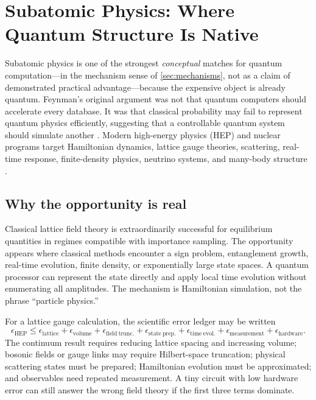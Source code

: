 \section{Subatomic Physics: Where Quantum Structure Is Native}\label{sec:hep}

Subatomic physics is one of the strongest \emph{conceptual} matches for quantum computation---in the mechanism sense of \cref{sec:mechanisms}, not as a claim of demonstrated practical advantage---because the expensive object is already quantum. Feynman's original argument was not that quantum computers should accelerate every database. It was that classical probability may fail to represent quantum physics efficiently, suggesting that a controllable quantum system should simulate another \citep{feynman1982}. Modern high-energy physics (HEP) and nuclear programs target Hamiltonian dynamics, lattice gauge theories, scattering, real-time response, finite-density physics, neutrino systems, and many-body structure \citep{bauer2023prx,bauer2023nrp,dimeglio2024}.

\subsection{Why the opportunity is real}

Classical lattice field theory is extraordinarily successful for equilibrium quantities in regimes compatible with importance sampling. The opportunity appears where classical methods encounter a sign problem, entanglement growth, real-time evolution, finite density, or exponentially large state spaces. A quantum processor can represent the state directly and apply local time evolution without enumerating all amplitudes. The mechanism is Hamiltonian simulation, not the phrase ``particle physics.''

For a lattice gauge calculation, the scientific error ledger may be written
\begin{equation}
\epsilon_{\mathrm{HEP}}
\leq
\epsilon_{\mathrm{lattice}}
+\epsilon_{\mathrm{volume}}
+\epsilon_{\mathrm{field\ trunc.}}
+\epsilon_{\mathrm{state\ prep.}}
+\epsilon_{\mathrm{time\ evol.}}
+\epsilon_{\mathrm{measurement}}
+\epsilon_{\mathrm{hardware}}.
\label{eq:hep-error}
\end{equation}
The continuum result requires reducing lattice spacing and increasing volume; bosonic fields or gauge links may require Hilbert-space truncation; physical scattering states must be prepared; Hamiltonian evolution must be approximated; and observables need repeated measurement. A tiny circuit with low hardware error can still answer the wrong field theory if the first three terms dominate.

